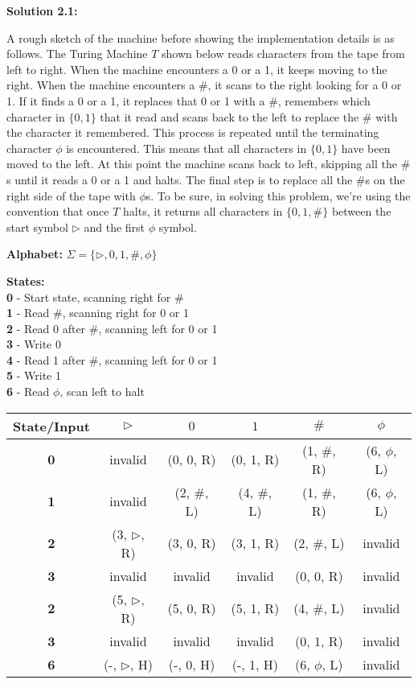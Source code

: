 \documentclass[11pt]{article}
\begin{document}
\textbf{Solution 2.1:} 

A rough sketch of the machine before showing the implementation details is as follows. The Turing Machine $T$ shown below reads characters from the tape from left to right. When the machine encounters a 0 or a 1, it keeps moving to the right. When the machine encounters a $\#$, it scans to the right looking for a 0 or 1. If it finds a 0 or a 1, it replaces that 0 or 1 with a $\#$, remembers which character in $\{0, 1\}$ that it read and scans back to the left to replace the $\#$ with the character it remembered. This process is repeated until the terminating character $\phi$ is encountered. This means that all characters in $\{0, 1\}$ have been moved to the left. At this point the machine scans back to left, skipping all the $\#$s until it reads a 0 or a 1 and halts. The final step is to replace all the $\#$s on the right side of the tape with $\phi$s. To be sure, in solving this problem, we're using the convention that once $T$ halts, it returns all characters in $\{0, 1, \#\}$ between the start symbol $\triangleright$ and the first $\phi$ symbol.

\textbf{Alphabet:} $\Sigma = \{\triangleright, 0, 1, \#, \phi\}$

\textbf{States:}\\
\textbf{0} - Start state, scanning right for $\#$ \\
\textbf{1} - Read $\#$, scanning right for 0 or 1 \\
\textbf{2} - Read 0 after $\#$, scanning left for 0 or 1 \\
\textbf{3} - Write 0 \\
\textbf{4} - Read 1 after $\#$, scanning left for 0 or 1 \\
\textbf{5} - Write 1 \\
\textbf{6} - Read $\phi$, scan left to halt

\begin{center}
\begin{tabular}{ | c | c | c | c | c | c |}
	\hline
	\textbf{State/Input} & $\triangleright$ & $0$ & $1$ & $\#$ & $\phi$ \\
	\hline\hline
	\textbf{0} & invalid & (0, 0, R) & (0, 1, R) & (1, $\#$, R) & (6, $\phi$, L) \\
	\hline
	\textbf{1} & invalid & (2, $\#$, L) & (4, $\#$, L) & (1, $\#$, R) & (6, $\phi$, L) \\
	\hline
	\textbf{2} & (3, $\triangleright$, R) & (3, 0, R) & (3, 1, R) & (2, $\#$, L) & invalid \\
	\hline
	\textbf{3} & invalid & invalid & invalid & (0, 0, R) & invalid \\
	\hline
	\textbf{2} & (5, $\triangleright$, R) & (5, 0, R) & (5, 1, R) & (4, $\#$, L) & invalid \\
	\hline
	\textbf{3} & invalid & invalid & invalid & (0, 1, R) & invalid \\
	\hline
	\textbf{6} & (-, $\triangleright$, H) & (-, 0, H) & (-, 1, H) & (6, $\phi$, L) & invalid \\
	\hline
\end{tabular}
\end{center}
\end{document}
